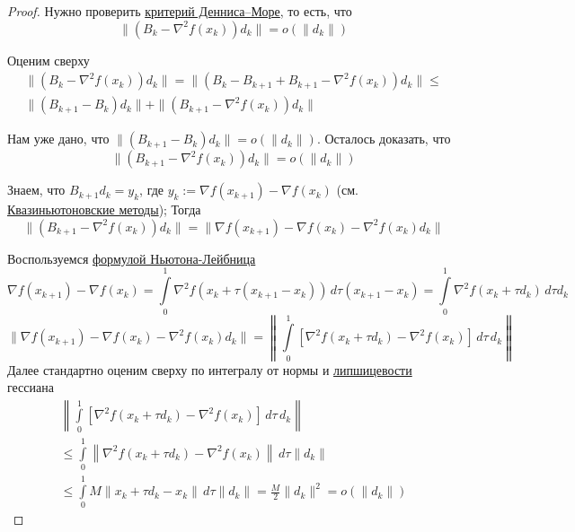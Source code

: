 \begin{proof}
  Нужно проверить \hyperref[note:D65FB534-B7F1-4194-8E4B-D4ACAA89E6D2]{критерий Денниса–Море}, то есть, что
  \[
  \|(B_k - \nabla^2f(x_k))d_k\| = o(\|d_k\|)
  \]

  Оценим сверху
  \begin{multline*}
  \|(B_k - \nabla^2f(x_k))d_k\| = \|(B_k - B_{k+1} + B_{k+1} - \nabla^2f(x_k))d_k\| \le \\
  \|(B_{k+1} - B_k)d_k\| +\|(B_{k+1} -\nabla^2 f(x_k))d_k\|
  \end{multline*}

  Нам уже дано, что $\|(B_{k+1} - B_k)d_k\| = o(\|d_k\|)$. Осталось доказать, что
  \[
  \|(B_{k+1} - \nabla^2 f(x_k))d_k\| = o(\|d_k\|)
  \]

  Знаем, что $B_{k+1}d_k = y_k$, где $y_k := \nabla f(x_{k+1}) - \nabla f(x_k)$ (см. \hyperref[note:6BA18878-DE34-46A5-ABE2-EDA09CAE56A7]{Квазиньютоновские методы}); Тогда
  \[
  \|(B_{k+1} - \nabla^2 f(x_k))d_k\| =
  \|\nabla f(x_{k+1}) - \nabla f(x_k) - \nabla^2 f(x_k)d_k\|
  \]

  Воспользуемся \hyperref[note:AD362344-ECDC-4627-B344-8356744E6E53]{формулой Ньютона-Лейбница}
  \[
  \nabla f(x_{k+1}) - \nabla f(x_k) = \int\limits_0^1 \nabla^2 f(x_k + \tau(x_{k+1} - x_k))\,d\tau (x_{k+1} - x_k) =
  \int\limits_0^1 \nabla^2 f(x_k + \tau d_k)\,d\tau d_k
  \]
  \[
   \|\nabla f(x_{k+1}) - \nabla f(x_k) - \nabla^2 f(x_k)d_k\| =
  \left\| \int\limits_0^1 \left[ \nabla^2 f(x_k + \tau d_k) - \nabla^2 f(x_k) \right]\, d\tau\, d_k \right\|
  \]
  Далее стандартно оценим сверху по интегралу от нормы и \hyperref[note:7E287F4B-AC3E-4CF5-9D32-3BC2BC52D01A]{липшицевости} гессиана
  \begin{multline*}
  \left\| \int\limits_0^1 \left[ \nabla^2 f(x_k + \tau d_k) - \nabla^2 f(x_k) \right]\, d\tau\, d_k \right\| \\
  \le
   \int\limits_0^1 \left\| \nabla^2 f(x_k + \tau d_k) - \nabla^2 f(x_k) \right\|\, d\tau \|d_k\|   \\
  \le \int\limits_0^1 M \|x_k + \tau d_k - x_k\|\,d\tau \|d_k\| = \frac{M}{2}\|d_k\|^2 = o(\|d_k\|)
  \end{multline*}
\end{proof}

